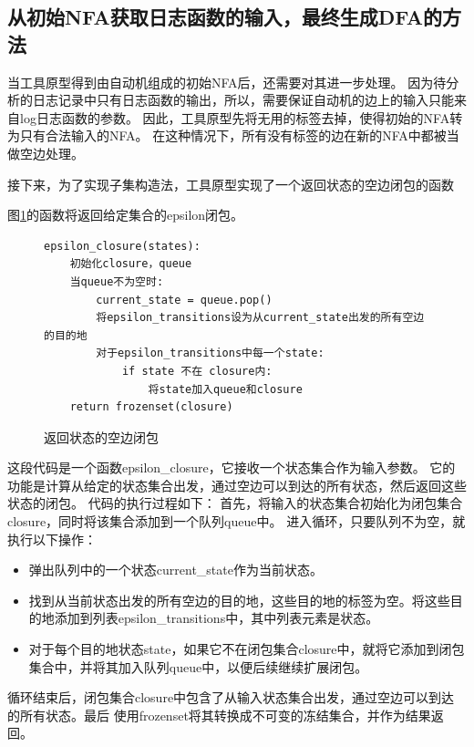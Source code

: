 \subsection{从初始NFA获取日志函数的输入，最终生成DFA的方法}
当工具原型得到由自动机组成的初始NFA后，还需要对其进一步处理。
因为待分析的日志记录中只有日志函数的输出，所以，需要保证自动机的边上的输入只能来自log日志函数的参数。
因此，工具原型先将无用的标签去掉，使得初始的NFA转为只有合法输入的NFA。
在这种情况下，所有没有标签的边在新的NFA中都被当做空边处理。

接下来，为了实现子集构造法，工具原型实现了一个返回状态的空边闭包的函数

图\ref{返回状态的空边闭包}的函数将返回给定集合的epsilon闭包。\\
 \begin{figure}[htbp]
	\centering
\begin{minipage}{14cm}
\begin{lstlisting}
epsilon_closure(states):
    初始化closure，queue
    当queue不为空时:
        current_state = queue.pop()
        将epsilon_transitions设为从current_state出发的所有空边的目的地
        对于epsilon_transitions中每一个state:
            if state 不在 closure内:
                将state加入queue和closure
    return frozenset(closure)
\end{lstlisting}
    \caption{返回状态的空边闭包}
    \label{返回状态的空边闭包}
\end{minipage}
\end{figure}
这段代码是一个函数epsilon\_closure，它接收一个状态集合作为输入参数。
它的功能是计算从给定的状态集合出发，通过空边可以到达的所有状态，然后返回这些状态的闭包。
代码的执行过程如下：
首先，将输入的状态集合初始化为闭包集合closure，同时将该集合添加到一个队列queue中。
进入循环，只要队列不为空，就执行以下操作：
\begin{itemize}
	\item 弹出队列中的一个状态current\_state作为当前状态。
	\item 找到从当前状态出发的所有空边的目的地，这些目的地的标签为空。将这些目的地添加到列表epsilon\_transitions中，其中列表元素是状态。
	\item 对于每个目的地状态state，如果它不在闭包集合closure中，就将它添加到闭包集合中，并将其加入队列queue中，以便后续继续扩展闭包。
\end{itemize}

循环结束后，闭包集合closure中包含了从输入状态集合出发，通过空边可以到达的所有状态。最后
使用frozenset将其转换成不可变的冻结集合，并作为结果返回。

